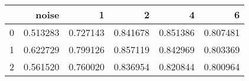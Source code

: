 \begin{tabular}{lrrrrr}
\toprule
{} &     noise &         1 &         2 &         4 &         6 \\
\midrule
0 &  0.513283 &  0.727143 &  0.841678 &  0.851386 &  0.807481 \\
1 &  0.622729 &  0.799126 &  0.857119 &  0.842969 &  0.803369 \\
2 &  0.561520 &  0.760020 &  0.836954 &  0.820844 &  0.800964 \\
\bottomrule
\end{tabular}
